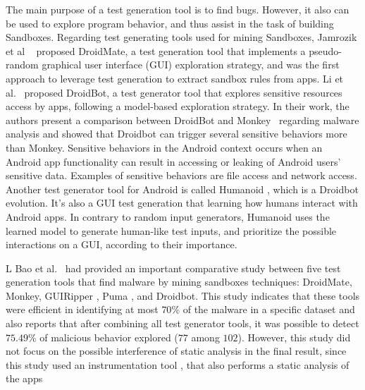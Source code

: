 The main purpose of a test generation tool is to find bugs. However, it also can be used to explore program behavior, and thus assist in the task of building Sandboxes. Regarding test generating tools used for mining Sandboxes, Jamrozik et al ~\cite{DBLP:conf/icse/JamrozikZ16} proposed DroidMate, a test generation tool that implements a pseudo-random graphical user interface (GUI) exploration strategy, and was the first approach to leverage test generation to extract sandbox rules from apps. Li et al.~\cite{DBLP:conf/icse/LiYGC17} proposed DroidBot, a test generator tool that explores sensitive resources access by apps, following a model-based exploration strategy. In their work, the authors present a comparison between DroidBot and Monkey~\cite{Monkey} regarding malware analysis and showed that Droidbot can trigger several sensitive behaviors more than Monkey. Sensitive behaviors in the Android context occurs when an Android app functionality can result in accessing or leaking of Android users' sensitive data. Examples of sensitive behaviors are file access and network access. Another test generator tool for Android is called Humanoid \cite{DBLP:conf/kbse/LiY0C19}, which is a Droidbot evolution. It's also a GUI test generation that learning how humans interact with Android apps. In contrary to random input generators, Humanoid uses the learned model to generate human-like test inputs, and prioritize the possible interactions on a GUI, according to their importance.



L Bao et al.~\cite{DBLP:conf/wcre/BaoLL18} had provided an important comparative study between five test generation tools that find malware by mining sandboxes techniques: DroidMate, Monkey, GUIRipper \cite{DBLP:conf/kbse/AmalfitanoFTCM12}, Puma \cite{DBLP:conf/mobisys/Hao0NHG14}, and Droidbot. This study indicates that these tools were efficient in identifying at most $70$\% of the malware in a specific dataset and also reports that after combining all test generator tools, it was possible to detect $75.49$\% of malicious behavior explored ($77$ among $102$). However, this study did not focus on the possible interference of static analysis in the final result, since this study used an instrumentation tool \cite{DBLP:conf/icsm/CaiR17a}, that also performs a static analysis of the apps 



